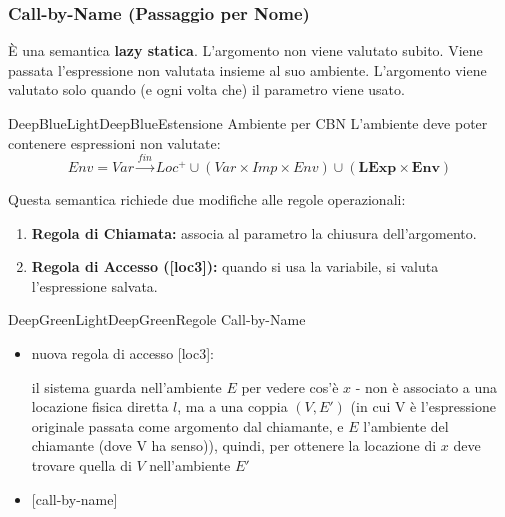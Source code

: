 \documentclass[a4paper,11pt]{report}
\begin{document}
\subsubsection*{Call-by-Name (Passaggio per Nome)}
È una semantica \textbf{lazy statica}. L'argomento non viene valutato subito. Viene passata l'espressione non valutata insieme al suo ambiente. L'argomento viene valutato solo quando (e ogni volta che) il parametro viene usato.

\begin{cframe}{DeepBlueLight}{DeepBlue}{Estensione Ambiente per CBN}
    L'ambiente deve poter contenere espressioni non valutate:
    \[ Env = Var \xrightarrow{fin} Loc^+ \cup (Var \times Imp \times Env) \cup \mathbf{(LExp \times Env)} \]
   
\end{cframe}

Questa semantica richiede due modifiche alle regole operazionali:
\begin{enumerate}
    \item \textbf{Regola di Chiamata:} associa al parametro la chiusura dell'argomento.
    \item \textbf{Regola di Accesso ([loc3]):} quando si usa la variabile, si valuta l'espressione salvata.
\end{enumerate}

\begin{cdefframe}{DeepGreenLight}{DeepGreen}{Regole Call-by-Name}{}
\begin{itemize}
\item{nuova regola di accesso} [loc3]:
\vspace{-1em}
    \begin{prooftree}
    \end{prooftree}

    il sistema guarda nell'ambiente \( E \) per vedere cos'è \( x \) - non è associato a una locazione fisica diretta \( l \), ma a una coppia \( (V, E') \) (in cui V è l'espressione originale passata come argomento dal chiamante, e \( E \) l'ambiente del chiamante (dove V ha senso)), quindi, per ottenere la locazione di \( x \) deve trovare quella di \( V \) nell'ambiente \( E' \)
\item{[call-by-name]}
\vspace{-1em}
    \begin{prooftree}
    \end{prooftree}
\end{itemize}
\end{cdefframe}
\end{document}
